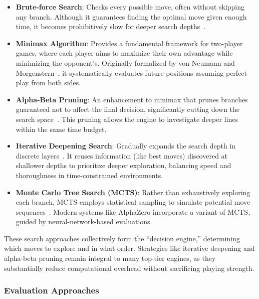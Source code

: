 \documentclass[12pt,a4paper]{article}
\begin{document}
\begin{itemize}
    \item \textbf{Brute-force Search}: 
    Checks every possible move, often without skipping any branch. Although it guarantees finding the optimal move given enough time, it becomes prohibitively slow for deeper search depths~\cite{Shannon1950}.

    \item \textbf{Minimax Algorithm}: 
    Provides a fundamental framework for two-player games, where each player aims to maximize their own advantage while minimizing the opponent’s. Originally formalized by von Neumann and Morgenstern~\cite{vonNeumann1944}, it systematically evaluates future positions assuming perfect play from both sides.

    \item \textbf{Alpha-Beta Pruning}: 
    An enhancement to minimax that prunes branches guaranteed not to affect the final decision, significantly cutting down the search space~\cite{Knuth1975}. This pruning allows the engine to investigate deeper lines within the same time budget.

    \item \textbf{Iterative Deepening Search}:
    Gradually expands the search depth in discrete layers~\cite{Korf1985}. It reuses information (like best moves) discovered at shallower depths to prioritize deeper exploration, balancing speed and thoroughness in time-constrained environments.

    \item \textbf{Monte Carlo Tree Search (MCTS)}:
    Rather than exhaustively exploring each branch, MCTS employs statistical sampling to simulate potential move sequences~\cite{Coulom2006}. Modern systems like AlphaZero incorporate a variant of MCTS, guided by neural-network-based evaluations.

\end{itemize}

These search approaches collectively form the “decision engine,” determining which moves to explore and in what order. Strategies like iterative deepening and alpha-beta pruning remain integral to many top-tier engines, as they substantially reduce computational overhead without sacrificing playing strength.


\subsubsection{Evaluation Approaches}
\label{sec:evaluation_approaches}
\end{document}
